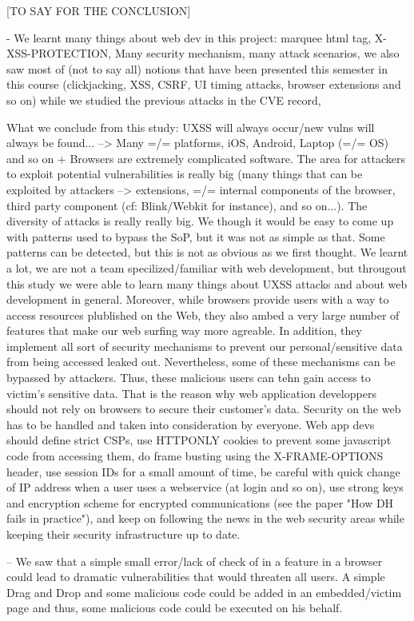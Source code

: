 \documentclass[journal]{IEEEtran}
\begin{document}
[TO SAY FOR THE CONCLUSION]

- We learnt many things about web dev in this project: marquee html tag, X-XSS-PROTECTION, Many security mechanism, many attack scenarios, we also saw most of (not to say all) notions that have been presented this semester in this course (clickjacking, XSS, CSRF, UI timing attacks, browser extensions and so on) while we studied the previous attacks in the CVE record,

What we conclude from this study: UXSS will always occur/new vulns will always be found... --> Many =/= platforms, iOS, Android, Laptop (=/= OS) and so on + Browsers are extremely complicated software. The area for attackers to exploit potential vulnerabilities is really big (many things that can be exploited by attackers --> extensions, =/= internal components of the browser, third party component (cf: Blink/Webkit for instance), and so on...). The diversity of attacks is really really big. We though it would be easy to come up with patterns used to bypass the SoP, but it was not as simple as that. Some patterns can be detected, but this is not as obvious as we first thought.
We learnt a lot, we are not a team specilized/familiar with web development, but througout this study we were able to learn many things about UXSS attacks and about web development in general.
Moreover, while browsers provide users with a way to access resources plublished on the Web, they also ambed a very large number of features that make our web surfing way more agreable. In addition, they implement all sort of security mechanisms to prevent our personal/sensitive data from being accessed leaked out. Nevertheless, some of these mechanisms can be bypassed by attackers. Thus, these malicious users can tehn gain access to victim's sensitive data. That is the reason why web application developpers should not rely on browsers to secure their customer's data. Security on the web has to be handled and taken into consideration by everyone. Web app devs should define strict CSPs, use HTTPONLY cookies to prevent some javascript code from accessing them, do frame busting using the X-FRAME-OPTIONS header, use session IDs for a small amount of time, be careful with quick change of IP address when a user uses a webservice (at login and so on), use strong keys and encryption scheme for encrypted communications (see the paper "How DH fails in practice"), and keep on following the news in the web security areas while keeping their security infrastructure up to date.

-- We saw that a simple small error/lack of check of in a feature in a browser could lead to dramatic vulnerabilities that would threaten all users. A simple Drag and Drop and some malicious code could be added in an embedded/victim page and thus, some malicious code could be executed on his behalf.
\end{document}

